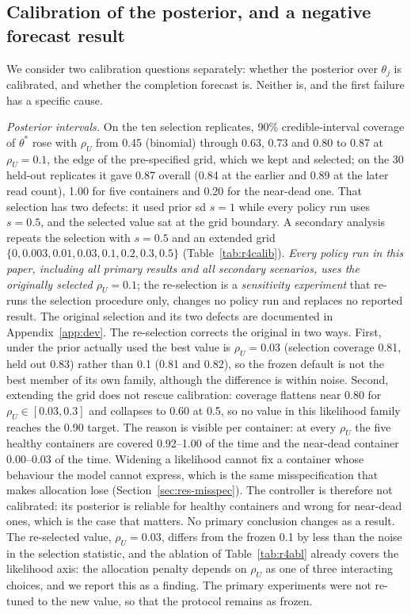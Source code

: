 \documentclass[conference,onecolumn,11pt]{IEEEtran}
\begin{document}
\subsection{Calibration of the posterior, and a negative forecast result}\label{sec:res-calib}

We consider two calibration questions separately: whether the posterior over $\theta_j$ is calibrated,
and whether the completion forecast is.  Neither is, and the first failure has a specific cause.

\emph{Posterior intervals.}  On the ten selection replicates, 90\% credible-interval coverage of
$\theta^\ast$ rose with $\rho_U$ from 0.45 (binomial) through 0.63, 0.73 and 0.80 to 0.87 at
$\rho_U{=}0.1$, the edge of the pre-specified grid, which we kept and selected; on the 30 held-out
replicates it gave 0.87 overall (0.84 at the earlier and 0.89 at the later read count), 1.00 for five
containers and 0.20 for the near-dead one.  That selection has two defects: it used prior sd $s{=}1$
while every policy run uses $s{=}0.5$, and the selected value sat at the grid boundary.  A secondary
analysis repeats the selection with $s{=}0.5$ and an extended grid
$\{0,0.003,0.01,0.03,0.1,0.2,0.3,0.5\}$ (Table~\ref{tab:r4calib}).  \emph{Every policy run in this
paper, including all primary results and all secondary scenarios, uses the originally selected
$\rho_U{=}0.1$}; the re-selection is a \emph{sensitivity experiment} that re-runs the selection
procedure only, changes no policy run and replaces no reported result.  The original selection and its
two defects are documented in Appendix~\ref{app:dev}.  The re-selection corrects the original in two
ways.  First, under
the prior actually used the best value is $\rho_U{=}0.03$ (selection coverage 0.81, held out 0.83)
rather than 0.1 (0.81 and 0.82), so the frozen default is not the best member of its own family,
although the difference is within noise.  Second, extending the grid does not rescue calibration:
coverage flattens near 0.80 for $\rho_U\in[0.03,0.3]$ and collapses to 0.60 at 0.5, so no value in this
likelihood family reaches the 0.90 target.  The reason is visible per container: at every $\rho_U$ the
five healthy containers are covered 0.92--1.00 of the time and the near-dead container 0.00--0.03 of the
time.  Widening a likelihood cannot fix a container whose behaviour the model cannot express, which is
the same misspecification that makes allocation lose (Section~\ref{sec:res-misspec}).  The controller
is therefore not calibrated: its posterior is reliable for healthy containers and wrong for near-dead
ones, which is the case that matters.  No primary conclusion changes as a result.  The re-selected
value, $\rho_U{=}0.03$, differs from the frozen 0.1 by less than the noise in the selection statistic,
and the ablation of Table~\ref{tab:r4abl} already covers the likelihood axis: the allocation penalty
depends on $\rho_U$ as one of three interacting choices, and we report this as a finding.  The primary
experiments were not re-tuned to the new value, so that the protocol remains as frozen.
\end{document}
